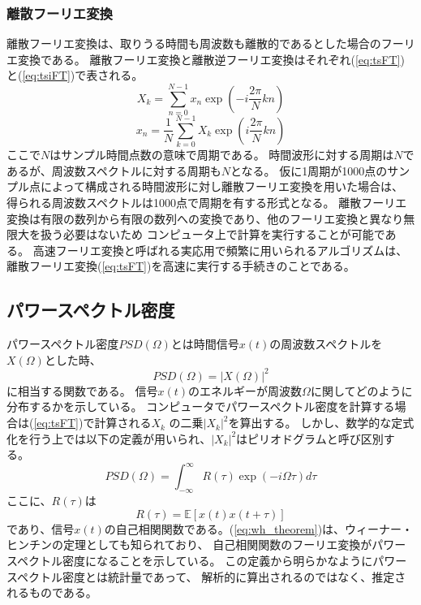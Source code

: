 \subsubsection{離散フーリエ変換}
離散フーリエ変換は、取りうる時間も周波数も離散的であるとした場合のフーリエ変換である。
離散フーリエ変換と離散逆フーリエ変換はそれぞれ(\ref{eq:tsFT})と(\ref{eq:tsiFT})で表される。
\begin{equation}
    X_k=\sum_{n = 0}^{N-1} x_n \exp \left(-i\frac{2\pi}{N} k n \right)
    \label{eq:tsFT}
\end{equation}
\begin{equation}
    x_n=\frac{1}{N}\sum_{k=0}^{N-1} X_k \exp \left(i \frac{2\pi}{N} k n \right)
    \label{eq:tsiFT}
\end{equation}
ここで\(N\)はサンプル時間点数の意味で周期である。
時間波形に対する周期は\(N\)であるが、周波数スペクトルに対する周期も\(N\)となる。
仮に1周期が1000点のサンプル点によって構成される時間波形に対し離散フーリエ変換を用いた場合は、
得られる周波数スペクトルは1000点で周期を有する形式となる。
離散フーリエ変換は有限の数列から有限の数列への変換であり、他のフーリエ変換と異なり無限大を扱う必要はないため
コンピュータ上で計算を実行することが可能である。
高速フーリエ変換と呼ばれる実応用で頻繁に用いられるアルゴリズムは、
離散フーリエ変換(\ref{eq:tsFT})を高速に実行する手続きのことである。

\subsection{パワースペクトル密度}
パワースペクトル密度\(PSD(\Omega)\)とは時間信号\(x(t)\)の周波数スペクトルを\(X(\Omega)\)とした時、
\begin{equation}
    PSD(\Omega)=|X(\Omega)|^2
    \label{period}
\end{equation}
に相当する関数である。
信号\(x(t)\)のエネルギーが周波数\(\Omega\)に関してどのように分布するかを示している。
コンピュータでパワースペクトル密度を計算する場合は(\ref{eq:tsFT})で計算される\(X_k\)
の二乗\(|X_k|^2\)を算出する。
しかし、数学的な定式化を行う上では以下の定義が用いられ、\(|X_k|^2\)はピリオドグラムと呼び区別する。
\begin{equation}
    PSD(\Omega) = \int_{-\infty}^{\infty} R(\tau)\exp(-i\Omega \tau)d\tau
    \label{eq:wh_theorem}
\end{equation}
ここに、\(R(\tau)\)は
\begin{equation}
    R(\tau)  =  \mathbb E[x(t)x(t+\tau)]    
\end{equation}
であり、信号\(x(t)\)の自己相関関数である。(\ref{eq:wh_theorem})は、ウィーナー・ヒンチンの定理としても知られており、
自己相関関数のフーリエ変換がパワースペクトル密度になることを示している。
この定義から明らかなようにパワースペクトル密度とは統計量であって、
解析的に算出されるのではなく、推定されるものである。

